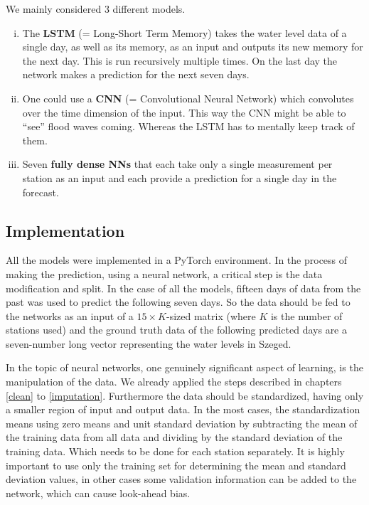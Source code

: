 \documentclass{article}
\newcommand{\tmstrong}[1]{\textbf{#1}}
\newenvironment{enumerateroman}{\begin{enumerate}[i.] }{\end{enumerate}}
\begin{document}
We mainly considered 3 different models.
\begin{enumerateroman}
  \item The {\tmstrong{LSTM}} (= Long-Short Term Memory) takes the water level
  data of a single day, as well as its memory, as an input and outputs its new
  memory for the next day. This is run recursively multiple times. On the last
  day the network makes a prediction for the next seven days.
  
  \item One could use a {\tmstrong{CNN}} (= Convolutional Neural Network)
  which convolutes over the time dimension of the input. This way the CNN
  might be able to ``see'' flood waves coming. Whereas the LSTM has to
  mentally keep track of them.
  
  \item Seven {\tmstrong{fully dense NNs}} that each take only a single
  measurement per station as an input and each provide a prediction for a
  single day in the forecast.
\end{enumerateroman}

\subsection{Implementation}

All the models were implemented in a PyTorch environment. In the process of
making the prediction, using a neural network, a critical step is the data
modification and split. In the case of all the models, fifteen days of data
from the past was used to predict the following seven days. So the data should
be fed to the networks as an input of a $15 \times K$-sized matrix (where $K$
is the number of stations used) and the ground truth data of the following
predicted days are a seven-number long vector representing the water levels in
Szeged.

In the topic of neural networks, one genuinely significant aspect of learning,
is the manipulation of the data. We already applied the steps described in
chapters \ref{clean} to \ref{imputation}. Furthermore the data should be
standardized, having only a smaller region of input and output data. In the
most cases, the standardization means using zero means and unit standard
deviation by subtracting the mean of the training data from all data and
dividing by the standard deviation of the training data. Which needs to be
done for each station separately. It is highly important to use only the
training set for determining the mean and standard deviation values, in other
cases some validation information can be added to the network, which can cause
look-ahead bias.
\end{document}
